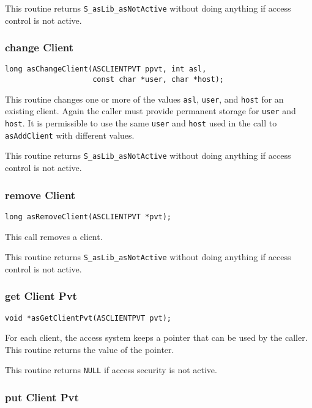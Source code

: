 This routine returns \verb|S_asLib_asNotActive| without doing anything if access control is not active.

\subsubsection{change Client}

\begin{verbatim}
long asChangeClient(ASCLIENTPVT ppvt, int asl,
                    const char *user, char *host);
\end{verbatim}

This routine changes one or more of the values \verb|asl|, \verb|user|, and \verb|host| for an existing client.
Again the caller must provide permanent storage for \verb|user| and \verb|host|.
It is permissible to use the same \verb|user| and \verb|host| used in the call to \verb|asAddClient| with different values.

This routine returns \verb|S_asLib_asNotActive| without doing anything if access control is not active.

\subsubsection{remove Client}

\begin{verbatim}
long asRemoveClient(ASCLIENTPVT *pvt);
\end{verbatim}

This call removes a client.

This routine returns \verb|S_asLib_asNotActive| without doing anything if access control is not active.

\subsubsection{get Client Pvt}

\begin{verbatim}
void *asGetClientPvt(ASCLIENTPVT pvt); 
\end{verbatim}

For each client, the access system keeps a pointer that can be used by the caller.
This routine returns the value of the pointer.

This routine returns \verb|NULL| if access security is not active.

\subsubsection{put Client Pvt}

